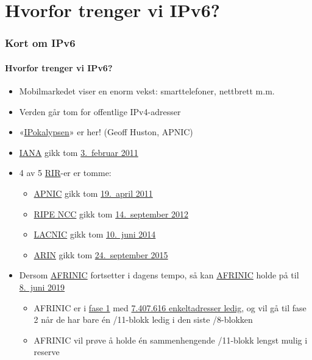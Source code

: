 \section{Hvorfor trenger vi IPv6?}
\begin{frame}
  \frametitle{Kort om IPv6}
  \framesubtitle{Hvorfor trenger vi IPv6?}
  \begin{itemize}
  \item Mobilmarkedet viser en enorm vekst: smarttelefoner, nettbrett m.m.
  \item Verden går tom for offentlige IPv4-adresser
  \item
    «\href{http://www.potaroo.net/presentations/2012-05-22-terena.pdf}{IPokalypsen}»
    er her! (Geoff Huston, APNIC)
  \item \href{http://www.iana.org/}{IANA} gikk tom
    \href{http://www.icann.org/en/news/press/releases/release-03feb11-en.pdf}{3.~februar
      2011}
  \item 4 av 5
    \href{http://en.wikipedia.org/wiki/Regional_Internet_registry}{RIR}-er
    er tomme:
    \begin{itemize}
    \item \href{http://www.apnic.net/}{APNIC} gikk tom
      \href{http://www.apnic.net/community/ipv4-exhaustion/graphical-information}{19.~april
        2011}
    \item \href{http://www.ripe.net/}{RIPE NCC} gikk tom
      \href{http://www.ripe.net/internet-coordination/ipv4-exhaustion}{14.~september
        2012}
    \item \href{http://www.lacnic.net/en/web/lacnic/inicio}{LACNIC}
      gikk tom
      \href{http://www.lacnic.net/en/web/lacnic/agotamiento-ipv4}{10.~juni
        2014}
    \item \href{https://www.arin.net/}{ARIN} gikk tom
      \href{https://www.arin.net/announcements/2015/20150924.html}{24.~september
        2015}
    \end{itemize}
  \item Dersom \href{http://www.afrinic.net/}{AFRINIC} fortsetter i
    dagens tempo, så kan
    \href{http://afrinic.net/en/community/ipv4-exhaustion}{AFRINIC}
    holde på til \href{http://www.potaroo.net/tools/ipv4/}{8.\ juni
      2019}
    \begin{itemize}
    \item AFRINIC er i
      \href{https://afrinic.net/en/library/news/1973-afrinic-is-approaching-ipv4-exhaustion-phase-1}{fase
        1} med
      \href{https://www.afrinic.net/www3-utils/statistics/ipv4_exhaustion/charts/bar/data/pool-usage.php}{7.407.616
        enkeltadresser ledig}, og vil gå til fase 2 når de har bare én
      /11-blokk ledig i den siste /8-blokken
    \item AFRINIC vil prøve å holde én sammenhengende /11-blokk lengst
      mulig i reserve
    \end{itemize}
  \end{itemize}
\end{frame}


